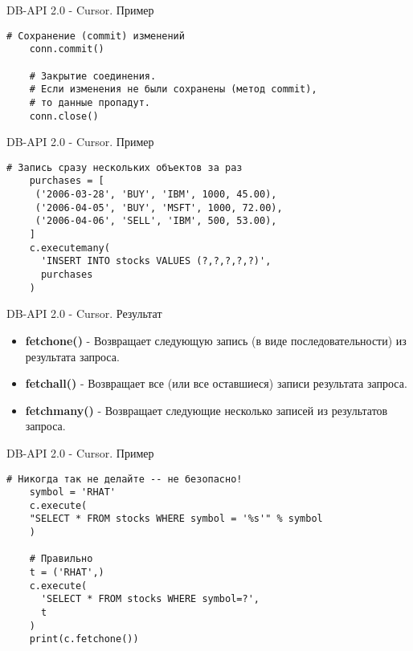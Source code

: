 \begin{frame}[fragile]{DB-API 2.0 - Cursor. Пример}

    \begin{lstlisting}[style=python]
    # Сохранение (commit) изменений
    conn.commit()

    # Закрытие соединения.
    # Если изменения не были сохранены (метод commit),
    # то данные пропадут.
    conn.close()
    \end{lstlisting}

\end{frame}

\begin{frame}[fragile]{DB-API 2.0 - Cursor. Пример}

    \begin{lstlisting}[style=python]
    # Запись сразу нескольких объектов за раз
    purchases = [
     ('2006-03-28', 'BUY', 'IBM', 1000, 45.00),
     ('2006-04-05', 'BUY', 'MSFT', 1000, 72.00),
     ('2006-04-06', 'SELL', 'IBM', 500, 53.00),
    ]
    c.executemany(
      'INSERT INTO stocks VALUES (?,?,?,?,?)',
      purchases
    )
    \end{lstlisting}

\end{frame}

\begin{frame}{DB-API 2.0 - Cursor. Результат}

  \begin{itemize}

    \item \textbf{fetchone()} - Возвращает следующую запись (в виде
      последовательности) из результата запроса.
    \item \textbf{fetchall()} - Возвращает все (или все оставшиеся) записи
      результата запроса.
    \item \textbf{fetchmany()} - Возвращает следующие несколько записей из
      результатов запроса.

  \end{itemize}

\end{frame}

\begin{frame}[fragile]{DB-API 2.0 - Cursor. Пример}

    \begin{lstlisting}[style=python]
    # Никогда так не делайте -- не безопасно!
    symbol = 'RHAT'
    c.execute(
    "SELECT * FROM stocks WHERE symbol = '%s'" % symbol
    )

    # Правильно
    t = ('RHAT',)
    c.execute(
      'SELECT * FROM stocks WHERE symbol=?',
      t
    )
    print(c.fetchone())
    \end{lstlisting}

\end{frame}

